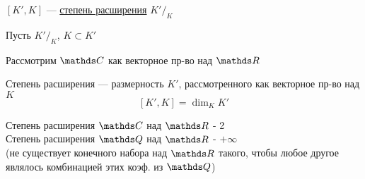 \documentclass[main.tex]{subfiles}
\begin{document}
    \begin{definition}
        $[K', K]$ --- \ul{степень расширения} $K'\big/_{\displaystyle K}$
    \end{definition}

    Пусть $K'\big/_{\displaystyle K}$, $K \subset K'$

    Рассмотрим $\CC$ как векторное пр-во над $\R$

    \begin{remark}
        Степень расширения --- размерность $K'$, рассмотренного как векторное пр-во над $K$
        \[[K',K] = \dim_K K'\]
    \end{remark}

    \begin{example}
        Степень расширения $\CC$ над $\R$ - 2\\
        Степень расширения $\Q$ над $\R$ - $+\infty$ \\
        (не существует конечного набора над $\R$
        такого, чтобы любое другое являлось комбинацией этих коэф. из $\Q$)
    \end{example}
\end{document}

